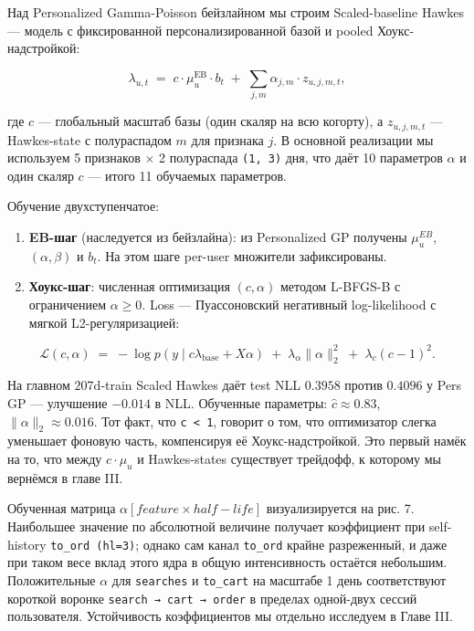 \documentclass[12pt,a4paper]{article}
\begin{document}
Над Personalized Gamma-Poisson бейзлайном мы строим Scaled-baseline Hawkes --- модель с фиксированной персонализированной базой и pooled Хоукс-надстройкой:

\[
\lambda_{u,t} \;=\; c \cdot \mu_u^{\mathrm{EB}} \cdot b_t \;+\; \sum_{j,m} \alpha_{j,m} \cdot z_{u,j,m,t},
\]

где $c$ --- глобальный масштаб базы (один скаляр на всю когорту), а $z_{u,j,m,t}$ --- Hawkes-state с полураспадом $m$ для признака $j$. В основной реализации мы используем 5 признаков $\times$ 2 полураспада \texttt{(1, 3)} дня, что даёт 10 параметров $\alpha $ и один скаляр $c$ --- итого 11 обучаемых параметров.

Обучение двухступенчатое:

\begin{enumerate}
  \item \textbf{EB-шаг} (наследуется из бейзлайна): из Personalized GP получены $\mu _u^{EB}$, $(\alpha , \beta )$ и $b_t$. На этом шаге per-user множители зафиксированы.
  \item \textbf{Хоукс-шаг}: численная оптимизация $(c, \alpha )$ методом L-BFGS-B с ограничением $\alpha  \geq  0$. Loss --- Пуассоновский негативный log-likelihood с мягкой L2-регуляризацией:
\end{enumerate}


\[
\mathcal{L}(c, \alpha) \;=\; -\log p\!\left(y \mid c \lambda_{\mathrm{base}} + X\alpha\right) \;+\; \lambda_\alpha \|\alpha\|_2^2 \;+\; \lambda_c (c - 1)^2.
\]

На главном $207\text{d}$-train Scaled Hawkes даёт test NLL $0.3958$ против $0.4096$ у Pers GP --- улучшение $-0.014$ в NLL. Обученные параметры: $\hat{c} \approx  0.83$, $\|\alpha \|_2 \approx  0.016$. Тот факт, что \texttt{c < 1}, говорит о том, что оптимизатор слегка уменьшает фоновую часть, компенсируя её Хоукс-надстройкой. Это первый намёк на то, что между $c \cdot  \mu _u$ и Hawkes-states существует трейдофф, к которому мы вернёмся в главе III.

Обученная матрица $\alpha [feature \times  half-life]$ визуализируется на рис. 7. Наибольшее значение по абсолютной величине получает коэффициент при self-history \texttt{to\_ord (hl=3)}; однако сам канал \texttt{to\_ord} крайне разреженный, и даже при таком весе вклад этого ядра в общую интенсивность остаётся небольшим. Положительные $\alpha $ для \texttt{searches} и \texttt{to\_cart} на масштабе 1 день соответствуют короткой воронке \texttt{search → cart → order} в пределах одной-двух сессий пользователя. Устойчивость коэффициентов мы отдельно исследуем в Главе III.
\end{document}
